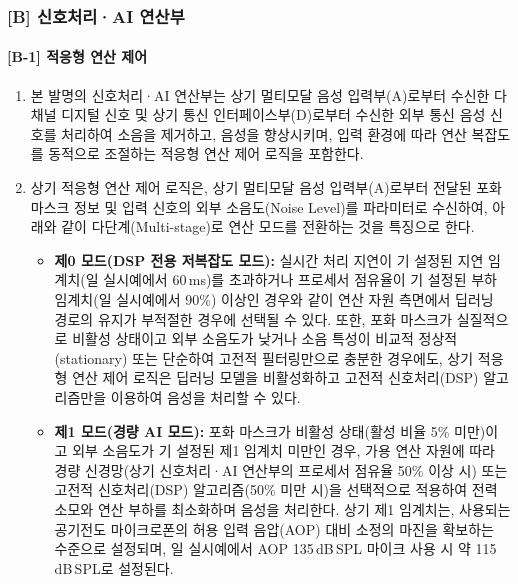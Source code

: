 \documentclass{article}
\begin{document}
\subsubsection{[B] 신호처리·AI 연산부}

\paragraph{[B-1] 적응형 연산 제어}

\begin{enumerate}[label = \textbf{(B.1.\arabic*)}]

    \item 본 발명의 신호처리·AI 연산부는 상기 멀티모달 음성 입력부(A)로부터 수신한 다채널 디지털 신호 및 상기 통신 인터페이스부(D)로부터 수신한 외부 통신 음성 신호를 처리하여 소음을 제거하고, 음성을 향상시키며, 입력 환경에 따라 연산 복잡도를 동적으로 조절하는 적응형 연산 제어 로직을 포함한다.

    \item 상기 적응형 연산 제어 로직은, 상기 멀티모달 음성 입력부(A)로부터 전달된 포화 마스크 정보 및 입력 신호의 외부 소음도(Noise Level)를 파라미터로 수신하여, 아래와 같이 다단계(Multi-stage)로 연산 모드를 전환하는 것을 특징으로 한다.

    \begin{itemize}
        \item \textbf{제0 모드(DSP 전용 저복잡도 모드):} 실시간 처리 지연이 기 설정된 지연 임계치(일 실시예에서 60\,ms)를
        초과하거나 프로세서 점유율이 기 설정된 부하 임계치(일 실시예에서 90\%) 이상인 경우와 같이 연산 자원 측면에서
        딥러닝 경로의 유지가 부적절한 경우에 선택될 수 있다. 또한, 포화 마스크가 실질적으로 비활성 상태이고
        외부 소음도가 낮거나 소음 특성이 비교적 정상적(stationary) 또는 단순하여 고전적 필터링만으로 충분한 경우에도,
        상기 적응형 연산 제어 로직은 딥러닝 모델을 비활성화하고 고전적 신호처리(DSP) 알고리즘만을 이용하여 음성을
        처리할 수 있다.

        \item \textbf{제1 모드(경량 AI 모드):} 포화 마스크가 비활성 상태(활성 비율 5\% 미만)이고
        외부 소음도가 기 설정된 제1 임계치 미만인 경우, 가용 연산 자원에 따라 경량 신경망(상기 신호처리·AI 연산부의 프로세서 점유율 50\% 이상 시) 또는
        고전적 신호처리(DSP) 알고리즘(50\% 미만 시)을 선택적으로 적용하여 전력 소모와 연산 부하를
        최소화하며 음성을 처리한다. 상기 제1 임계치는, 사용되는 공기전도 마이크로폰의 허용 입력 음압(AOP) 대비 소정의 마진을 확보하는 수준으로 설정되며, 일 실시예에서 AOP 135\,dB\,SPL 마이크 사용 시 약 115\,dB\,SPL로 설정된다.


\end{itemize}
\end{enumerate}
\end{document}
